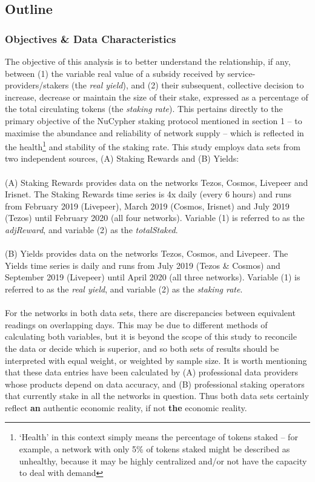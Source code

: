 \documentclass[longbibliography,nofootinbib]{revtex4-1}
\begin{document}
\subsection{Outline}

\subsubsection{Objectives \& Data Characteristics}

The objective of this analysis is to better understand the relationship, if any, between (1) the variable real value of a subsidy received by service-providers/stakers (the \textit{real yield}), and (2) their subsequent, collective decision to increase, decrease or maintain the size of their stake, expressed as a percentage of the total circulating tokens (the \textit{staking rate}). This pertains directly to the primary objective of the NuCypher staking protocol mentioned in section 1 – to maximise the abundance and reliability of network supply – which is reflected in the health\footnote{`Health' in this context simply means the percentage of tokens staked – for example, a network with only 5\% of tokens staked might be described as unhealthy, because it may be highly centralized and/or not have the capacity to deal with demand} and stability of the staking rate. This study employs data sets from two independent sources, (A) Staking Rewards and (B) Yields:
\\\\
(A) Staking Rewards provides data on the networks Tezos, Cosmos, Livepeer and Irisnet. The Staking Rewards time series is 4x daily (every 6 hours) and runs from February 2019 (Livepeer), March 2019 (Cosmos, Irisnet) and July 2019 (Tezos) until February 2020 (all four networks). Variable (1) is referred to as the \textit{adjReward}, and variable (2) as the \textit{totalStaked}. 
\\\\
(B) Yields provides data on the networks Tezos, Cosmos, and Livepeer. The Yields time series is daily and runs from July 2019 (Tezos \& Cosmos) and September 2019 (Livepeer) until April 2020 (all three networks). Variable (1) is referred to as the \textit{real yield}, and variable (2) as the \textit{staking rate}. 
\\\\
For the networks in both data sets, there are discrepancies between equivalent readings on overlapping days. This may be due to different methods of calculating both variables, but it is beyond the scope of this study to reconcile the data or decide which is superior, and so both sets of results should be interpreted with equal weight, or weighted by sample size. It is worth mentioning that these data entries have been calculated by (A) professional data providers whose products depend on data accuracy, and (B) professional staking operators that currently stake in all the networks in question. Thus both data sets certainly reflect \textbf{an} authentic economic reality, if not \textbf{the} economic reality. 
\end{document}

